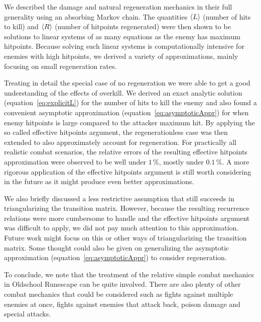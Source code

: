 We described the damage and natural regeneration mechanics in their full generality using an absorbing Markov chain. The quantities $\left\langle L \right\rangle$ (number of hits to kill) and $\left\langle R \right\rangle$ (number of hitpoints regenerated) were then shown to be solutions to linear systems of as many equations as the enemy has maximum hitpoints. Because solving such linear systems is computationally intensive for enemies with high hitpoints, we derived a variety of approximations, mainly focusing on small regeneration rates.

Treating in detail the special case of no regeneration we were able to get a good understanding of the effects of overkill. We derived an exact analytic solution (equation~\ref{eq:explicitL}) for the number of hits to kill the enemy and also found a convenient asymptotic approximation (equation~\ref{eq:asymptoticAppr}) for when enemy hitpoints is large compared to the attacker maximum hit. By applying the so called effective hitpoints argument, the regenerationless case was then extended to also approximately account for regeneration. For practically all realistic combat scenarios, the relative errors of the resulting effective hitpoints approximation were observed to be well under $1\,\%$, mostly under $0.1\,\%$. A more rigorous application of the effective hitpoints argument is still worth considering in the future as it might produce even better approximations.

We also briefly discussed a less restrictive assumption that still succeeds in triangularizing the transition matrix. However, because the resulting recurrence relations were more cumbersome to handle and the effective hitpoints argument was difficult to apply, we did not pay much attention to this approximation. Future work might focus on this or other ways of triangularizing the transition matrix. Some thought could also be given on generalizing the asymptotic approximation (equation~\ref{eq:asymptoticAppr}) to consider regeneration.

To conclude, we note that the treatment of the relative simple combat mechanics in Oldschool Runescape can be quite involved. There are also plenty of other combat mechanics that could be considered such as fights against multiple enemies at once, fights against enemies that attack back, poison damage and special attacks.


